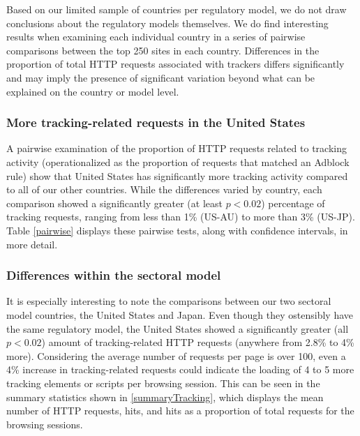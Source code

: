 \documentclass[conference]{IEEEtran}
\newcommand{\todo}[1]{}
\renewcommand{\todo}[1]{{\color{red} TODO: {#1}}}
\begin{document}
Based on our limited sample of countries per regulatory model, we do not draw conclusions about the regulatory models themselves. We do find interesting results when examining each individual country in a series of pairwise comparisons between the top 250 sites in each country.  Differences in the proportion of total HTTP requests associated with trackers differs significantly and may imply the presence of significant variation beyond what can be explained on the country or model level.

\subsubsection{More tracking-related requests in the United States}
A pairwise examination of the proportion of HTTP requests related to tracking activity (operationalized as the proportion of requests that matched an Adblock rule) show that United States has significantly more tracking activity compared to all of our other countries. While the differences varied by country, each comparison showed a significantly greater (at least $p<0.02$) percentage of tracking requests, ranging from less than 1\% (US-AU) to more than 3\% (US-JP). Table \ref{pairwise} displays these pairwise tests, along with confidence intervals, in more detail.

\subsubsection{Differences within the sectoral model}
It is especially interesting to note the comparisons between our two sectoral model countries, the United States and Japan. Even though they ostensibly have the same regulatory model, the United States showed a significantly greater (all $p<0.02$) amount of tracking-related HTTP requests (anywhere from 2.8\% to 4\% more). Considering the average number of requests per page is over 100, even a 4\% increase in tracking-related requests could indicate the loading of 4 to 5 more tracking elements or scripts per browsing session. This can be seen in the summary statistics shown in \ref{summaryTracking}, which displays the mean number of HTTP requests, hits, and hits as a proportion of total requests for the browsing sessions. 
\end{document}
